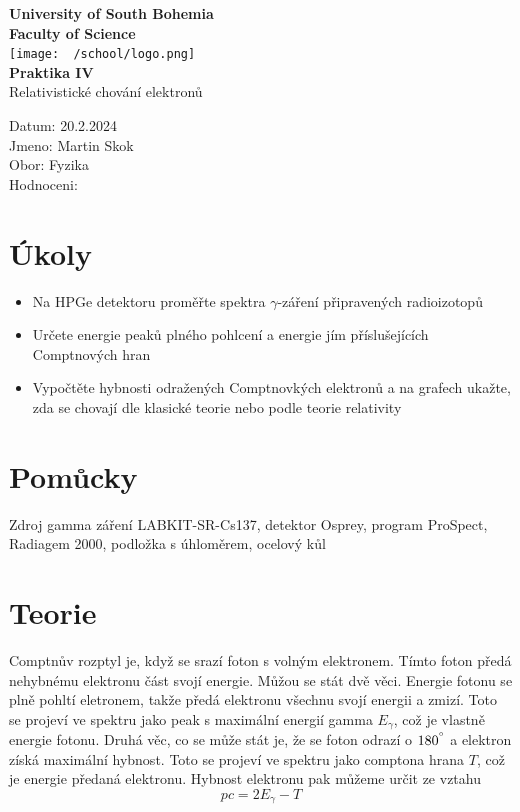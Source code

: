 \documentclass{article}
\begin{document}
\begin{center}
\textbf{\Huge{University of South Bohemia}}\\
\vspace{50px}
\textbf{\Large{Faculty of Science}} \\
\vspace{30px}
\texttt{[image: ~/school/logo.png]} \\
\vspace{30px}
\textbf{\large{Praktika IV}}
\vspace{20px}
\\
\vspace{20px}
\large{Relativistické chování elektronů} \\
\vspace{60px}
\end{center}
\begin{flushleft}
Datum: 20.2.2024 \\
Jmeno: Martin Skok \\
Obor: Fyzika \\
Hodnoceni:
\end{flushleft}
\newpage
\section{Úkoly}
\begin{itemize}
  \item Na HPGe detektoru proměřte spektra $\gamma$-záření připravených radioizotopů
  \item Určete energie peaků plného pohlcení a energie jím příslušejících Comptnových hran
  \item Vypočtěte hybnosti odražených Comptnovkých elektronů a na grafech ukažte,
        zda se chovají dle klasické teorie nebo podle teorie relativity
\end{itemize}
\section{Pomůcky}
Zdroj gamma záření LABKIT-SR-Cs137, detektor Osprey, program ProSpect, Radiagem
2000, podložka s úhloměrem, ocelový kůl
\section{Teorie}
Comptnův rozptyl je, když se srazí foton s volným elektronem. Tímto foton předá nehybnému elektronu část svojí energie. Můžou se stát dvě věci. Energie fotonu se plně pohltí eletronem, takže předá elektronu všechnu svojí energii a zmizí. Toto se projeví ve spektru jako peak s maximální energií gamma $E_{\gamma}$, což je vlastně energie fotonu.
Druhá věc, co se může stát je, že se foton odrazí o $180^{\degree}$ a elektron získá maximální hybnost. Toto se projeví ve spektru jako comptona hrana $T$, což je energie předaná elektronu.
Hybnost elektronu pak můžeme určit ze vztahu
\begin{equation}\label{eq:hyb}
  pc = 2E_{\gamma} - T
\end{equation}
\end{document}
